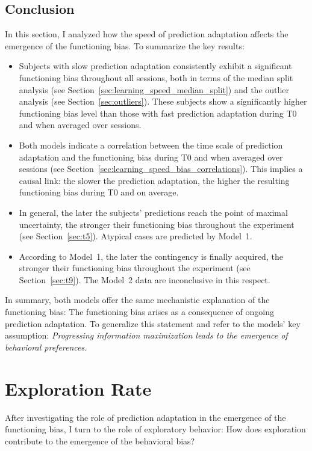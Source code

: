 \documentclass[a4paper]{scrreprt}
\begin{document}
\subsection{Conclusion}
\label{sec:learning_speed_conclusion}

In this section, I analyzed how the speed of prediction adaptation affects the emergence of the functioning bias. To summarize the key results:
\begin{itemize}
\item Subjects with slow prediction adaptation consistently exhibit a significant functioning bias throughout all sessions, both in terms of the median split analysis (see Section~\ref{sec:learning_speed_median_split}) and the outlier analysis (see Section~\ref{sec:outliers}). These subjects show a significantly higher functioning bias level than those with fast prediction adaptation during T0 and when averaged over sessions.
\item Both models indicate a correlation between the time scale of prediction adaptation and the functioning bias during T0 and when averaged over sessions (see Section~\ref{sec:learning_speed_bias_correlations}). This implies a causal link: the slower the prediction adaptation, the higher the resulting functioning bias during T0 and on average.
\item In general, the later the subjects' predictions reach the point of maximal uncertainty, the stronger their functioning bias throughout the experiment (see Section~\ref{sec:t5}). Atypical cases are predicted by Model~1.
\item According to Model~1, the later the contingency is finally acquired, the stronger their functioning bias throughout the experiment (see Section~\ref{sec:t9}). The Model~2 data are inconclusive in this respect.
\end{itemize}
In summary, both models offer the same mechanistic explanation of the functioning bias: The functioning bias arises as a consequence of ongoing prediction adaptation. To generalize this statement and refer to the models' key assumption: 
\textit{Progressing information maximization leads to the emergence of behavioral preferences.}

\clearpage

\section{Exploration Rate}
\label{sec:exploration_rate}

After investigating the role of prediction adaptation in the emergence of the functioning bias, I turn to the role of exploratory behavior: How does exploration contribute to the emergence of the behavioral bias?
\end{document}
